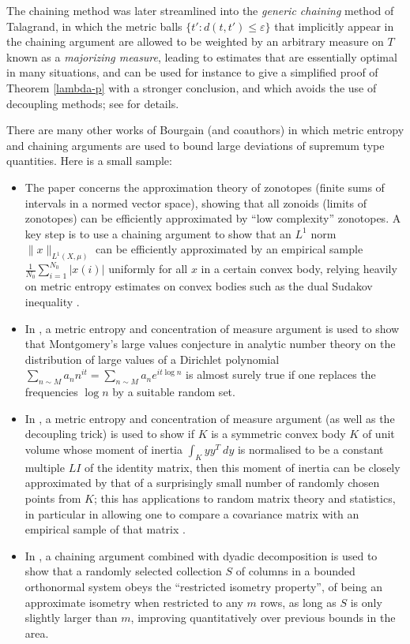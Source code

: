 \documentclass[12pt,a4paper,reqno]{amsart}
\numberwithin{equation}{section}
\theoremstyle{plain}
\theoremstyle{definition}
\newcommand\eps{\varepsilon}
\begin{document}
The chaining method was later streamlined into the \emph{generic chaining} method of Talagrand, in which the metric balls $\{ t': d(t,t') \leq \eps\}$ that implicitly appear in the chaining argument are allowed to be weighted by an arbitrary measure on $T$ known as a \emph{majorizing measure}, leading to estimates that are essentially optimal in many situations, and can be used for instance to give a simplified proof of Theorem \ref{lambda-p} with a stronger conclusion, and which avoids the use of decoupling methods; see \cite{talagrand} for details.

There are many other works of Bourgain (and coauthors) in which metric entropy and chaining arguments are used to bound large deviations of supremum type quantities.  Here is a small sample:

\begin{itemize}
  \item The paper \cite{zonotopes} concerns the approximation theory of zonotopes (finite sums of intervals in a normed vector space), showing that all zonoids (limits of zonotopes) can be efficiently approximated by ``low complexity'' zonotopes.  A key step is to use a chaining argument to show that an $L^1$ norm $\|x\|_{L^1(X,\mu)}$ can be efficiently approximated by an empirical sample $\frac{1}{N_0} \sum_{i=1}^{N_0} |x(i)|$ uniformly for all $x$ in a certain convex body, relying heavily on metric entropy estimates on convex bodies such as the dual Sudakov inequality \cite{pajor}. 	
	\item In \cite{hal}, a metric entropy and concentration of measure argument is used to show that Montgomery's large values conjecture \cite{mont} in analytic number theory on the distribution of large values of a Dirichlet polynomial $\sum_{n \sim M} a_n n^{it} = \sum_{n \sim M} a_n e^{it\log n}$ is almost surely true if one replaces the frequencies $\log n$ by a suitable random set.
	\item In \cite{iso}, a metric entropy and concentration of measure argument (as well as the decoupling trick) is used to show if $K$ is a symmetric convex body $K$ of unit volume whose moment of inertia $\int_K yy^T\ dy$ is normalised to be a constant multiple $LI$ of the identity matrix, then this moment of inertia can be closely approximated by that of a surprisingly small number of randomly chosen points from $K$; this has applications to random matrix theory and statistics, in particular in allowing one to compare a covariance matrix with an empirical sample of that matrix \cite{empirical}. 
	\item In \cite{rip}, a chaining argument combined with dyadic decomposition is used to show that a randomly selected collection $S$ of columns in a bounded orthonormal system obeys the ``restricted isometry property'', of being an approximate isometry when restricted to any $m$ rows, as long as $S$ is only slightly larger than $m$, improving quantitatively over previous bounds \cite{candes,rv} in the area.
\end{itemize}
\end{document}
